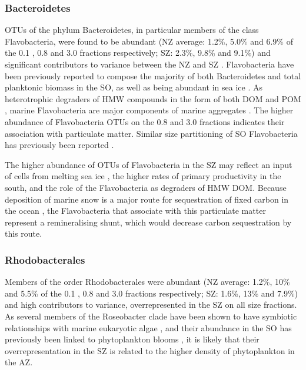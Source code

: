 \subsubsection{Bacteroidetes}

\acp{OTU} of the phylum Bacteroidetes, in particular members of the class Flavobacteria, were found to be abundant (\ac{NZ} average: 1.2\%, 5.0\% and 6.9\% of the 0.1 \micron{}, 0.8 \micron{} and 3.0 \micron{} fractions respectively; SZ: 2.3\%, 9.8\% and 9.1\%) and significant contributors to variance between the \ac{NZ} and \ac{SZ} .
Flavobacteria have been previously reported to compose the majority of both Bacteroidetes \cite{Murray:2007db} and total planktonic biomass \cite{Abell:2005ji} in the \ac{SO}, as well as being abundant in sea ice \cite{Brown:2001hh}.
As heterotrophic degraders of \ac{HMW} compounds in the form of both \ac{DOM} and \ac{POM} \cite{Kirchman:2002ub}, marine Flavobacteria are major components of marine aggregates \cite{Rath:1998wm,Crump:1999wo,Zhang:2007fb}.
The higher abundance of Flavobacteria \acp{OTU} on the 0.8 \micron{} and 3.0 \micron{} fractions indicates their association with particulate matter.
Similar size partitioning of \ac{SO} Flavobacteria has previously been reported \cite{Abell:2005ji}.

The higher abundance of \acp{OTU} of Flavobacteria in the \ac{SZ} may reflect an input of cells from melting sea ice \cite{Brown:2001hh}, the higher rates of primary productivity in the south, and the role of the Flavobacteria as degraders of \ac{HMW} \ac{DOM}.
Because deposition of marine snow is a major route for sequestration of fixed carbon in the ocean \citep[e.g.][]{Hessen:2004vq}, the Flavobacteria that associate with this particulate matter represent a remineralising shunt, which would decrease carbon sequestration by this route.

\subsubsection{Rhodobacterales}

Members of the order Rhodobacterales were abundant (\ac{NZ} average: 1.2\%, 10\% and 5.5\% of the 0.1 \micron{}, 0.8 \micron{} and 3.0 \micron{} fractions respectively; \ac{SZ}: 1.6\%, 13\% and 7.9\%) and high contributors to variance, overrepresented in the \ac{SZ} on all size fractions.
As several members of the Roseobacter clade have been shown to have symbiotic relationships with marine eukaryotic algae \cite{Anonymous:2005hd,WagnerDobler:2006kb}, and their abundance in the \ac{SO} has previously been linked to phytoplankton blooms \cite{West:2008kc,Obernosterer:2011df}, it is likely that their overrepresentation in the \ac{SZ} is related to the higher density of phytoplankton in the \ac{AZ}.

